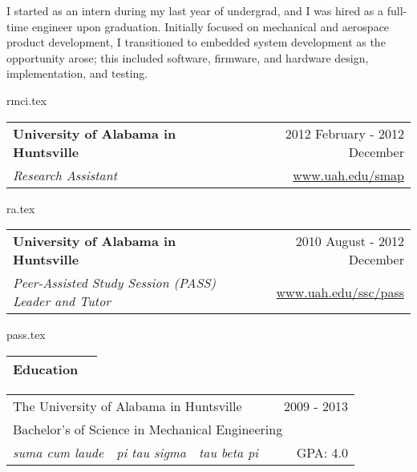 \documentclass[10pt,a4paper]{article}
\newcommand{\csection}[1]{\Large\textbf{#1}}
\newcommand{\csubsection}[1]{\large\textbf{#1}}
\begin{document}
I started as an intern during my last year of undergrad, and I was hired as a full-time
engineer upon graduation. Initially focused on mechanical and aerospace product
development, I transitioned to embedded system development as the opportunity arose; this
included software, firmware, and hardware design, implementation, and testing.

\bigskip

{rmci.tex}

\noindent\begin{tabularx}{\textwidth}{Xr}
  \toprule
  \csubsection{University of Alabama in Huntsville} & 2012 February - 2012 December                     \\
  \textit{Research Assistant}                       & \href{https://www.uah.edu/smap}{www.uah.edu/smap} \\
\end{tabularx}

{ra.tex}

\noindent\begin{tabularx}{\textwidth}{Xr}
  \toprule
  \csubsection{University of Alabama in Huntsville}            & 2010 August - 2012 December                               \\
  \textit{Peer-Assisted Study Session (PASS) Leader and Tutor} & \href{https://www.uah.edu/ssc/pass}{www.uah.edu/ssc/pass} \\
\end{tabularx}

{pass.tex}

\noindent\begin{tabularx}{\textwidth}{Xr}
  \csection{Education} & \\
  \bottomrule
\end{tabularx}
\smallskip

\noindent\begin{tabularx}{\textwidth}{cccXr}
  \multicolumn{3}{l}{The University of Alabama in Huntsville} &                       & 2009 - 2013                        \\
  \multicolumn{5}{l}{\hspace{.125in} Bachelor's of Science in Mechanical Engineering}                                      \\
  \hspace{.125in} \textit{suma cum laude}                     & \textit{pi tau sigma} & \textit{tau beta pi} &  & GPA: 4.0 \\
\end{tabularx}
\bigskip
\end{document}
